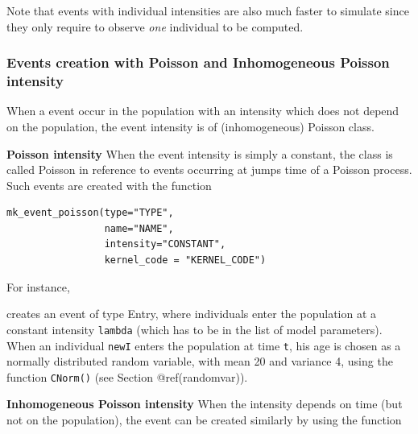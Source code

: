 Note that events with individual intensities are also much faster to simulate since they only require to observe \emph{one} individual to be computed.

\hypertarget{events-creation-with-poisson-and-inhomogeneous-poisson-intensity}{%
\subsubsection{Events creation with Poisson and Inhomogeneous Poisson intensity}\label{events-creation-with-poisson-and-inhomogeneous-poisson-intensity}}

When a event occur in the population with an intensity which does not depend on the population, the event intensity is of (inhomogeneous) Poisson class.

\textbf{Poisson intensity} When the event intensity is simply a constant, the class is called Poisson in reference to events occurring at jumps time of a Poisson process. Such events are created with the function

\begin{verbatim}
mk_event_poisson(type="TYPE",
                 name="NAME",
                 intensity="CONSTANT",
                 kernel_code = "KERNEL_CODE")
\end{verbatim}

For instance,

\begin{Shaded}
\begin{Highlighting}[]
\NormalTok{(} \NormalTok{, } \NormalTok{,}
                  
\NormalTok{)}
\end{Highlighting}
\end{Shaded}

creates an event of type Entry, where individuals enter the population at a constant intensity \texttt{lambda} (which has to be in the list of model parameters). When an individual \texttt{newI} enters the population at time \texttt{t}, his age is chosen as a normally distributed random variable, with mean 20 and variance 4, using the function \texttt{CNorm()} (see Section @ref(randomvar)).

\textbf{Inhomogeneous Poisson intensity} When the intensity depends on time (but not on the population), the event can be created similarly by using the function

